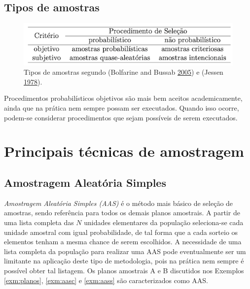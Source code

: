 \documentclass[
]{book}
\theoremstyle{definition}
\theoremstyle{definition}
\theoremstyle{definition}
\theoremstyle{remark}
\begin{document}
\hypertarget{tipos-de-amostras}{%
\subsection{Tipos de amostras}\label{tipos-de-amostras}}

\begin{figure}
\centering
\includegraphics{img/criterio.png}
\caption{Tipos de amostras segundo (Bolfarine and Bussab \protect\hyperlink{ref-bolfarine2005elementos}{2005}) e (Jessen \protect\hyperlink{ref-jessen1978statistical}{1978}).}
\end{figure}

Procedimentos probabilísticos objetivos são mais bem aceitos academicamente, ainda que na prática nem sempre possam ser executados. Quando isso ocorre, podem-se considerar procedimentos que sejam possíveis de serem executados.

\hypertarget{principais-tuxe9cnicas-de-amostragem}{%
\section{Principais técnicas de amostragem}\label{principais-tuxe9cnicas-de-amostragem}}

\hypertarget{amostragem-aleatuxf3ria-simples}{%
\subsection{Amostragem Aleatória Simples}\label{amostragem-aleatuxf3ria-simples}}

\emph{Amostragem Aleatória Simples (AAS)} é o método mais básico de seleção de amostras, sendo referência para todos os demais planos amostrais. A partir de uma lista completa das \(N\) unidades elementares da população seleciona-se cada unidade amostral com igual probabilidade, de tal forma que a cada sorteio os elementos tenham a mesma chance de serem escolhidos. A necessidade de uma lista completa da população para realizar uma AAS pode eventualmente ser um limitante na aplicação deste tipo de metodologia, pois na prática nem sempre é possível obter tal listagem. Os planos amostrais A e B discutidos nos Exemplos \ref{exm:planos}, \ref{exm:aasc} e \ref{exm:aass} são caracterizados como AAS.
\end{document}
